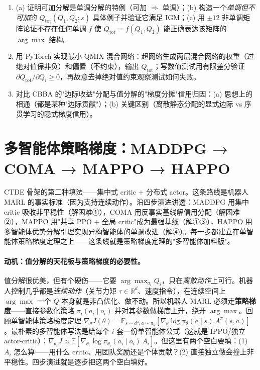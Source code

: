 \begin{practice}
\begin{enumerate}
  \item (a) 证明可加分解是单调分解的特例（可加 $\Rightarrow$ 单调）；(b) 构造一个\emph{单调但不可加}的 $Q_{\text{tot}}(Q_1,Q_2;s)$ 具体例子并验证它满足 IGM；(c) 用 $\pm12$ 非单调矩阵论证不存在任何单调 $f$ 使 $Q_{\text{tot}}=f(Q_1,Q_2)$ 能正确表达该矩阵的 $\arg\max$ 结构。
  \item 用 PyTorch 实现最小 QMIX 混合网络：超网络生成两层混合网络的权重（过绝对值保非负）和偏置（不约束），输出 $Q_{\text{tot}}$；写数值测试用有限差分验证 $\partial Q_{\text{tot}}/\partial Q_i\ge0$，再故意去掉绝对值约束观察测试如何失败。
  \item 对比 CBBA 的"边际收益"分配与值分解的"梯度分摊"信用归因：(a) 思想上的相通（都是某种"边际贡献"）；(b) 关键区别（离散静态分配的显式边际 vs 序贯学习的隐式梯度信用）。
\end{enumerate}
\end{practice}

\section{多智能体策略梯度：MADDPG → COMA → MAPPO → HAPPO}
\label{sec:sm-policygrad}

CTDE 骨架的第二种填法——集中式 critic $+$ 分布式 actor。这条路线是机器人 MARL 的事实标准（因为支持连续动作）。沿四步演进讲透：MADDPG 用集中 critic 吸收非平稳性（解困难①），COMA 用反事实基线解信用分配（解困难②），MAPPO 用"共享 PPO $+$ 全局 critic"成为最强基线（解①③），HAPPO 用多智能体优势分解引理实现异构智能体的单调改进（解④）。每一步都建立在单智能体策略梯度定理之上——这条线就是策略梯度定理的"多智能体加料版"。

\paragraph{动机：值分解的天花板与策略梯度的必要性。}
值分解很优美，但有个硬伤——它要 $\arg\max_{a_i}Q_i$，只在\emph{离散动作}上可行。机器人控制几乎都是\emph{连续动作}（关节力矩 $\tau\in\mathbb{R}^d$、速度指令），在连续空间上 $\arg\max$ 一个 $Q$ 本身就是非凸优化、做不动。所以机器人 MARL 必须走\textbf{策略梯度}——直接参数化策略 $\pi_i(a_i\mid o_i)$ 并对其参数做梯度上升，绕开 $\arg\max$。回顾单智能体策略梯度定理 $\nabla_\theta J(\theta)=\mathbb{E}_{s\sim d^\pi,a\sim\pi_\theta}[\nabla_\theta\log\pi_\theta(a\mid s)\,A^\pi(s,a)]$。最朴素的多智能体写法是给每个 $i$ 套一份单智能体公式（这就是 IPPO/独立 actor-critic）：$\nabla_{\theta_i}J\approx\mathbb{E}[\nabla_{\theta_i}\log\pi_{\theta_i}(a_i\mid o_i)\,A_i]$。但这里有两个空白要填：(1) $A_i$ 怎么算——用什么 critic、用团队奖励还是个体贡献？(2) 直接独立做会撞上非平稳性。四步演进就是逐步把这两个空白填好。

